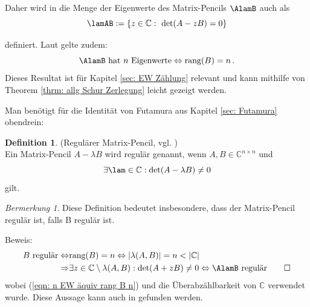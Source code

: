 \documentclass[a4paper,12pt]{report}
\newcommand{\C}{\mathbb C}
\newcommand{\rang}{\text{rang}}
\newcommand{\Cnn}{\C^{n\times n}}
\newcommand{\1}{\mathds{1}}
\theoremstyle{plain} %
\theoremstyle{definition} %
\newtheorem{definition}[theorem]{Definition}
\theoremstyle{remark}
\newtheorem{remark}[theorem]{Bermerkung}
\begin{document}
            Daher wird in \cite[S. 375]{matrixGolub} die Menge der Eigenwerte des Matrix-Pencils $\AlamB$ auch als
            \begin{equation}
                  \label{def: EW Pencil}
                  \lamAB:=\{z\in\C:\ \det(A - zB) = 0\}
            \end{equation}

            definiert. Laut \cite[S. 375]{matrixGolub} gelte zudem:
            \begin{equation}
                  \label{eqn: n EW äquiv rang B n}
                  \AlamB \text{ hat }n\text{ Eigenwerte}\Leftrightarrow \rang(B)=n\, .
            \end{equation}
            Dieses Resultat ist für Kapitel \ref{sec: EW Zählung} relevant und kann mithilfe von Theorem \ref{thrm: allg Schur Zerlegung} leicht gezeigt werden.

            Man benötigt für die Identität von Futamura aus Kapitel \ref{sec: Futamura} obendrein:
            \begin{definition}(Regulärer Matrix-Pencil, vgl. \cite[S. 376]{regularMatrixPencil})\\
                  \label{def: regulärer Pencil}
                  Ein Matrix-Pencil $A-\lambda B$ wird regulär genannt, wenn $A,B\in \Cnn$ und
                  $$\exists \lam\in\C:\det(A-\lambda B)\ne 0$$
                  gilt.
            \end{definition}

            \begin{remark}
                  \label{bem: B reg impl pencil reg}
                  Diese Definition bedeutet insbesondere, dass der Matrix-Pencil regulär ist, falls B regulär ist.

                  Beweis:
                  \begin{align*}
                        B\text{ regulär} \Leftrightarrow & \rang(B)=n\Leftrightarrow |\lambda(A,B)| = n<|\C|\\
                        \Rightarrow & \exists z\in\C\setminus\lambda(A,B): \det(A+zB) \ne 0 \Leftrightarrow \AlamB \text{ regulär}\qed
                  \end{align*}
                  wobei (\ref{eqn: n EW äquiv rang B n}) und die Überabzählbarkeit von $\C$ verwendet wurde.
                  Diese Aussage kann auch in \cite[S. 376]{regularMatrixPencil} gefunden werden.
            \end{remark}
            
\end{document}
